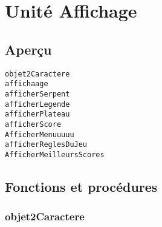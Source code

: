 \documentclass{report}
\newif\ifpdf
\begin{document}
\label{toc}\tableofcontents
\newpage
\newlength{\tmplength}
\chapter{Unité Affichage}
\label{Affichage}
\section{Aperçu}
\begin{description}
\item[\texttt{objet2Caractere}]
\item[\texttt{affichaage}]
\item[\texttt{afficherSerpent}]
\item[\texttt{afficherLegende}]
\item[\texttt{afficherPlateau}]
\item[\texttt{afficherScore}]
\item[\texttt{AfficherMenuuuuu}]
\item[\texttt{afficherReglesDuJeu}]
\item[\texttt{AfficherMeilleursScores}]
\end{description}
\section{Fonctions et procédures}
\ifpdf
\subsection*{\large{\textbf{objet2Caractere}}\normalsize\hspace{1ex}\hrulefill}
\else
\end{document}
